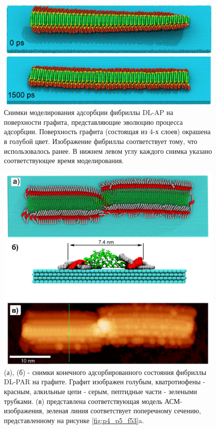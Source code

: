 \begin{figure} [H]
    \centering
    \includegraphics[width=\textwidth]{images/p4/punkt5/part4_p5_f50.pdf}
    \caption[Снимки моделирования адсорбции фибриллы DL-AP на поверхности графита, представляющие эволюцию процесса адсорбции]{Снимки моделирования адсорбции фибриллы DL-AP на поверхности графита, представляющие эволюцию процесса адсорбции. Поверхность графита (состоящая из 4-х слоев) окрашена в голубой цвет. Изображение фибриллы соответствует тому, что использовалось ранее. В нижнем левом углу каждого снимка указано соответствующее время моделирования.}
    \label{fig:p4_p5_f50}
\end{figure}


\begin{figure} [H]
    \centering
    \includegraphics[width=\textwidth]{images/p4/punkt5/part4_p5_f51.pdf}
    \caption[Снимки конечного адсорбированного состояния фибриллы DL-PAR на графите]{(а), (б) - снимки конечного адсорбированного состояния фибриллы DL-PAR на графите. Графит изображен голубым, кватротиофены - красным, алкильные цепи - серым, пептидные части - зелеными трубками. (в) представлена соответствующая модель АСМ-изображения, зеленая линия соответствует поперечному сечению, представленному на рисунке \ref{fig:p4_p5_f53}a.}
    \label{fig:p4_p5_f51}
\end{figure}


